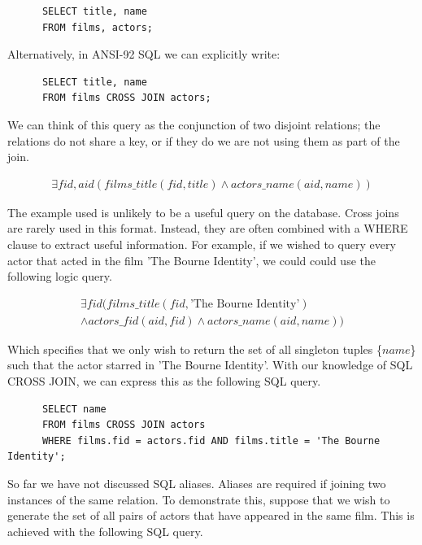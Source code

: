 \documentclass[a4paper, 11pt]{article}
\begin{document}
      \begin{verbatim}
      SELECT title, name
      FROM films, actors;
      \end{verbatim}

      Alternatively, in ANSI-92 SQL we can explicitly write:

      \begin{verbatim}
      SELECT title, name
      FROM films CROSS JOIN actors;
      \end{verbatim}

      We can think of this query as the conjunction of two disjoint relations;
      the relations do not share a key, or if they do we are not using them as
      part of the join.

      \begin{gather}
        \exists fid, aid(films\_title(fid, title) \land actors\_name(aid, name))
      \end{gather}

      The example used is unlikely to be a useful query on the database. Cross
      joins are rarely used in this format. Instead, they are often combined
      with a WHERE clause to extract useful information. For example, if we
      wished to query every actor that acted in the film 'The Bourne Identity',
      we could could use the following logic query.

      \begin{gather}
        \exists fid(films\_title(fid, \text{'The Bourne Identity'}) \nonumber\\
        \land actors\_fid(aid, fid) \land actors\_name(aid, name))
      \end{gather}

      Which specifies that we only wish to return the set of all singleton
      tuples \{$name$\} such that the actor starred in 'The Bourne Identity'.
      With our knowledge of SQL CROSS JOIN, we can express this as the
      following SQL query.

      \begin{verbatim}
      SELECT name
      FROM films CROSS JOIN actors
      WHERE films.fid = actors.fid AND films.title = 'The Bourne Identity';
      \end{verbatim}

      So far we have not discussed SQL aliases. Aliases are required if joining
      two instances of the same relation. To demonstrate this, suppose that we
      wish to generate the set of all pairs of actors that have appeared in the
      same film. This is achieved with the following SQL query.
\end{document}
